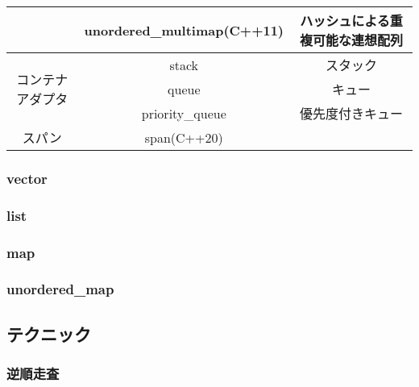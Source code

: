 \begin{table}[]
\begin{center}
\begin{tabular}{c|cc}
                                        & unordered\_multimap(C++11) & ハッシュによる重複可能な連想配列           \\ \hline
    \multirow{3}{*}{コンテナアダプタ}           & stack               & スタック                       \\ \cline{2-3}
                                        & queue               & キュー                        \\ \cline{2-3}
                                        & priority\_queue     & 優先度付きキュー                   \\ \hline
    スパン                                 & span(C++20)                &  \\ \hline
    \end{tabular}
    \end{center}
\end{table}
\subsubsection{vector}

\subsubsection{list}

\subsubsection{map}

\subsubsection{unordered\_map}

\subsection{テクニック}

\subsubsection{逆順走査}

